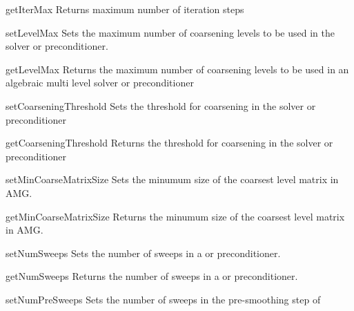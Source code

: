 \begin{methoddesc}[SolverOptions]{getIterMax}{}
Returns maximum number of iteration steps
\end{methoddesc}

\begin{methoddesc}[SolverOptions]{setLevelMax}{}
Sets the maximum number of coarsening levels to be used in the \AMG solver or preconditioner.
\end{methoddesc}

\begin{methoddesc}[SolverOptions]{getLevelMax}{}
Returns the maximum number of coarsening levels to be used in an algebraic multi level solver or preconditioner
\end{methoddesc}

\begin{methoddesc}[SolverOptions]{setCoarseningThreshold}{}
Sets the threshold for coarsening in the \AMG solver or preconditioner
\end{methoddesc}

\begin{methoddesc}[SolverOptions]{getCoarseningThreshold}{}
Returns the threshold for coarsening in the \AMG solver or preconditioner
\end{methoddesc}

\begin{methoddesc}[SolverOptions]{setMinCoarseMatrixSize}{}
Sets the minumum size of the coarsest level matrix in AMG.
\end{methoddesc}

\begin{methoddesc}[SolverOptions]{getMinCoarseMatrixSize}{}
Returns the minumum size of the coarsest level matrix in AMG.
\end{methoddesc}

\begin{methoddesc}[SolverOptions]{setNumSweeps}{}
Sets the number of sweeps in a \JACOBI or \GAUSSSEIDEL preconditioner.
\end{methoddesc}

\begin{methoddesc}[SolverOptions]{getNumSweeps}{}
Returns the number of sweeps in a \JACOBI or \GAUSSSEIDEL preconditioner.
\end{methoddesc}

\begin{methoddesc}[SolverOptions]{setNumPreSweeps}{}
Sets the number of sweeps in the pre-smoothing step of \AMG
\end{methoddesc}

